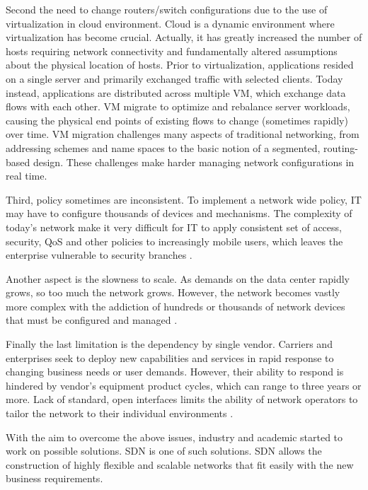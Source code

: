 Second the need to change routers/switch configurations due to the use of virtualization \cite{ieee:sdn-and-virtualization} in cloud environment. Cloud is a dynamic environment where virtualization has become crucial. Actually, it has greatly increased the number of hosts requiring network connectivity and fundamentally altered assumptions about the physical location of hosts. Prior to virtualization, applications resided on a single server and primarily exchanged traffic with selected clients. Today instead, applications are distributed across multiple \ac{VM}, which exchange data flows with each other. \ac{VM} migrate to optimize and rebalance server workloads, causing the physical end points of existing flows to change (sometimes rapidly) over time. \ac{VM} migration challenges many aspects of traditional networking, from addressing schemes and name spaces to the basic notion of a segmented, routing-based design. These challenges make harder managing network configurations in real time.

Third, policy sometimes are inconsistent. To implement a network wide policy, \ac{IT} may have to configure thousands of devices and mechanisms. The complexity of today's network make it very difficult for \ac{IT} to apply consistent set of access, security, \ac{QoS} and other policies to increasingly mobile users, which leaves the enterprise vulnerable to security branches \cite{onf:sdn-description:policies}.

Another aspect is the slowness to scale. As demands on the data center rapidly grows, so too much the network grows. However, the network becomes vastly more complex with the addiction of hundreds or thousands of network devices that must be configured and managed \cite{onf:sdn-description:scale}.

Finally the last limitation is the dependency by single vendor. Carriers and enterprises seek to deploy new capabilities and services in rapid response to changing business needs or user demands. However, their ability to respond is hindered by vendor's equipment product cycles, which can range to three years or more. Lack of standard, open interfaces limits the ability of network operators to tailor the network to their individual environments \cite{onf:sdn-description:vendor-dependency}.

With the aim to overcome the above issues, industry and academic started to work on possible solutions. \acf{SDN} is one of such solutions. \ac{SDN} allows the construction of highly flexible and scalable networks that fit easily with the new business requirements.

